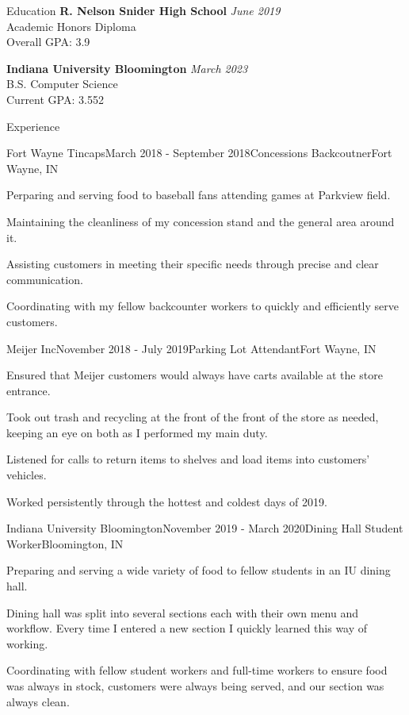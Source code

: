\documentclass{resume}
\begin{document}
  \begin{rSection}{Education}
    {\bf R. Nelson Snider High School} \hfill {\em June 2019} \\ 
    { Academic Honors Diploma } \\
    Overall GPA: 3.9

    {\bf Indiana University Bloomington} \hfill {\em March 2023} \\ 
    { B.S. Computer Science } \\
    Current GPA: 3.552
  \end{rSection}
  
  \begin{rSection}{Experience}
  
	  \begin{rSubsection}{Fort Wayne Tincaps}{March 2018 - September 2018}{Concessions Backcoutner}{Fort Wayne, IN}
	\item Perparing and serving food to baseball fans attending games at Parkview field.
	\item Maintaining the cleanliness of my concession stand and the general area around it.
	\item Assisting customers in meeting their specific needs through precise and clear communication.
	\item Coordinating with my fellow backcounter workers to quickly and efficiently serve customers.
	\end{rSubsection}

	\begin{rSubsection}{Meijer Inc}{November 2018 - July 2019}{Parking Lot Attendant}{Fort Wayne, IN}
	\item Ensured that Meijer customers would always have carts available at the store entrance.
	\item Took out trash and recycling at the front of the front of the store as needed, keeping an eye on both as I performed my main duty.
	\item Listened for calls to return items to shelves and load items into customers' vehicles.
	\item Worked persistently through the hottest and coldest days of 2019.
	\end{rSubsection}

	\begin{rSubsection}{Indiana University Bloomington}{November 2019 - March 2020}{Dining Hall Student Worker}{Bloomington, IN}
	\item Preparing and serving a wide variety of food to fellow students in an IU dining hall.
	\item Dining hall was split into several sections each with their own menu and workflow. Every time I entered a new section I quickly learned this way of working.
	\item Coordinating with fellow student workers and full-time workers to ensure food was always in stock, customers were always being served, and our section was always clean.
	\end{rSubsection}
  
  \end{rSection}
  
\end{document}
